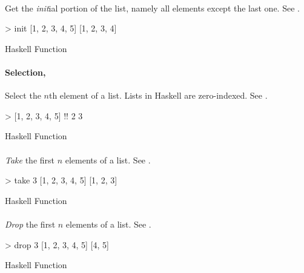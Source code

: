 \paragraph{\texorpdfstring{}{\texttt{init}}}\label{par:List_Init_Function}
Get the \emph{init}ial portion of the list, namely all elements except the last one.
See .
\begin{listing}[h!tbp]
\begin{haskellsource}
  > init [1, 2, 3, 4, 5]
  [1, 2, 3, 4]
\end{haskellsource}
\caption{Haskell  Function}
\label{lst:List_Init_Function}
\end{listing}

\paragraph{\texorpdfstring{Selection, \haskellinline{!!}}{Selection, \texttt{!!}}}\label{par:List_Select_Function}
Select the $n$th element of a list. Lists in Haskell are zero-indexed.
See .
\begin{listing}[h!tbp]
\begin{haskellsource}
  > [1, 2, 3, 4, 5] !! 2
  3
\end{haskellsource}
\caption{Haskell \haskellinline{!!} Function}
\label{lst:List_Select_Function}
\end{listing}

\paragraph{\texorpdfstring{}{\texttt{take}}}\label{par:List_Take_Function}
\emph{Take} the first $n$ elements of a list.
See .
\begin{listing}[h!tbp]
\begin{haskellsource}
  > take 3 [1, 2, 3, 4, 5]
  [1, 2, 3]
\end{haskellsource}
\caption{Haskell  Function}
\label{lst:List_Take_Function}
\end{listing}

\paragraph{\texorpdfstring{}{\texttt{drop}}}\label{par:List_Drop_Function}
\emph{Drop} the first $n$ elements of a list.
See .
\begin{listing}[h!tbp]
\begin{haskellsource}
  > drop 3 [1, 2, 3, 4, 5]
  [4, 5]
\end{haskellsource}
\caption{Haskell  Function}
\label{lst:List_Drop_Function}
\end{listing}

